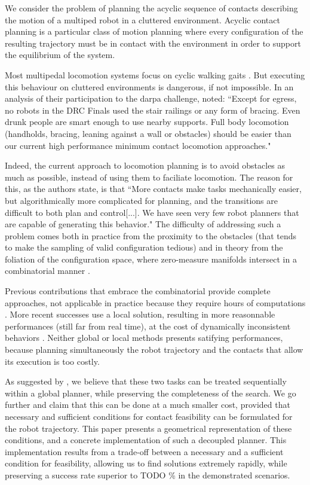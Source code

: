 We consider the problem of planning the acyclic sequence of contacts describing the motion of a multiped robot in a cluttered environment. Acyclic contact planning is a particular class of motion planning where every configuration of the resulting trajectory must be in contact with the environment in order to support the equilibrium of the system.

Most multipedal locomotion systems focus on cyclic walking gaits \citep{Kajita03a}. But executing
this behaviour on cluttered environments is dangerous, if not impossible.
In an analysis of their participation to the darpa challenge, \citeauthor{atkensondarpa}
noted: ``Except for egress, no robots in the DRC Finals used
the  stair  railings  or  any  form  of  bracing.   Even  drunk  people  are  smart  enough  to  use  nearby  supports.
Full body locomotion (handholds,  bracing,  leaning against a wall or obstacles) should be easier than our
current high performance minimum contact locomotion approaches."

Indeed, the current approach to locomotion planning is to avoid obstacles as much as possible, instead of using them
to faciliate locomotion. The reason for this, as the authors state, is that ``More contacts make tasks
mechanically easier, but algorithmically more complicated for planning, and the transitions are difficult to
both plan and control[...].  We have seen very few robot planners that are  capable of  generating this  behavior."
The difficulty of addressing such a problem comes both in practice from the proximity to the obstacles (that tends to make the sampling of valid configuration tedious) and in theory from the foliation of the configuration space, where zero-measure manifolds intersect in a combinatorial manner \citep{simeon-manipulation-04}.

Previous contributions that embrace the combinatorial provide complete approaches, not applicable in practice because they require hours of computations \citep{conf/iser/BretlRLKA04}.
More recent successes use a local solution, resulting in more reasonnable performances (still far from real time), at the cost of dynamically inconsistent behaviors \citep{Mordatch:2012:DCB:2185520.2185539}.
Neither global or local methods presents satifying performances, because planning simultaneously the robot trajectory and the contacts that allow
its execution is too costly. 

As suggested by \citeauthor{Bouyarmane2009}, we believe that these two tasks can be treated sequentially within a global planner, while preserving the completeness of the search.
We go further and claim that this can be done at a much smaller cost, provided that necessary and sufficient conditions for contact feasibility can be formulated for the robot trajectory.
This paper presents a geometrical representation of these conditions, and a concrete implementation of such a decoupled planner.
This implementation results from a trade-off between a necessary and a sufficient condition for feasibility, allowing us to find solutions extremely rapidly,
while preserving a success rate superior to TODO \% in the demonstrated scenarios.

